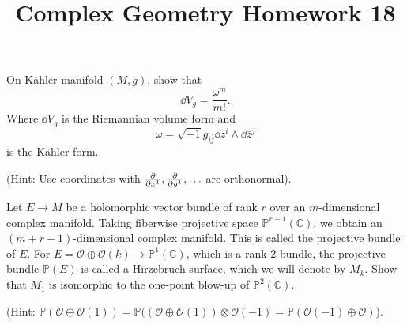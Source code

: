 \documentclass[12pt]{article}
\title{Complex Geometry Homework 18}
\author{}
\date{}
\begin{document}
\maketitle
\begin{problem}
  On Kähler manifold \((M,g)\), show that \[
    \dd{V_g}=\frac{\omega^m}{m!}
  .\] Where \(\dd{V_g}\) is the Riemannian volume form and \[
    \omega=\sqrt{-1}g_{i\bar{j}}\dd{z^i}\wedge\dd{\bar{z}^j}
  \] is the Kähler form.

  (Hint: Use coordinates with \(\pdv{}{x^1},\pdv{}{y^1},\ldots\) are orthonormal).
\end{problem}
\begin{problem}
  Let \(E\to M\) be a holomorphic vector bundle of rank \(r\) over an
  \(m\)-dimensional complex manifold. Taking fiberwise projective space
  \(\mathbb{P}^{r-1}(\mathbb{C})\), we obtain an \((m+r-1)\)-dimensional
  complex manifold. This is called the projective bundle of \(E\).
  For \(E=\mathcal{O}\oplus \mathcal{O}(k)\to \mathbb{P}^1(\mathbb{C})\),
  which is a rank 2 bundle, the projective bundle \(\mathbb{P}(E)\) is called
  a Hirzebruch surface, which we will denote by \(M_k\).
  Show that \(M_1\) is isomorphic to the one-point blow-up of
  \(\mathbb{P}^2(\mathbb{C})\).

  (Hint: \(\mathbb{P}(\mathcal{O}\oplus \mathcal{O}(1))=\mathbb{P}((\mathcal{O}
  \oplus\mathcal{O}(1))\otimes \mathcal{O}(-1)=\mathbb{P}(\mathcal{O}(-1)\oplus
  \mathcal{O})\)).
  \begin{center}
    
  \end{center}
\end{problem}
\end{document}
